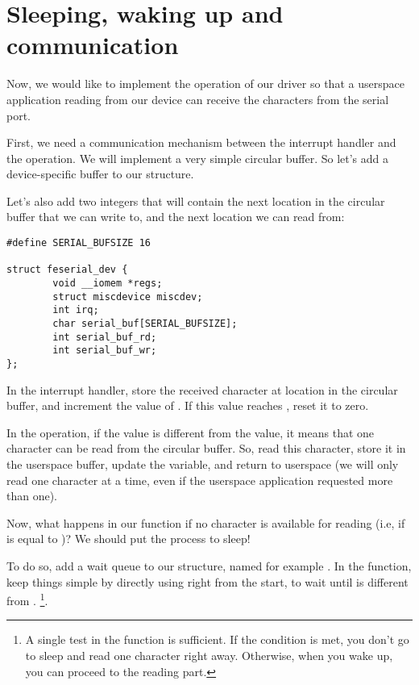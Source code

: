 \section{Sleeping, waking up and communication}

Now, we would like to implement the  operation of our
driver so that a userspace application reading from our device can
receive the characters from the serial port.

First, we need a communication mechanism between the interrupt handler
and the  operation. We will implement a very simple
circular buffer. So let's add a device-specific buffer to our 
 structure.

Let's also add two integers that will contain the next location
in the circular buffer that we can write to, and the next location
we can read from:

\begin{verbatim}
#define SERIAL_BUFSIZE 16

struct feserial_dev {
        void __iomem *regs;
        struct miscdevice miscdev;
        int irq;
        char serial_buf[SERIAL_BUFSIZE];
        int serial_buf_rd;
        int serial_buf_wr;
};
\end{verbatim}

In the interrupt handler, store the received character at location
 in the circular buffer, and increment the value
of . If this value reaches ,
reset it to zero.

In the  operation, if the  value is
different from the  value, it means that one
character can be read from the circular buffer. So, read this
character, store it in the userspace buffer, update the
 variable, and return to userspace (we will only
read one character at a time, even if the userspace application
requested more than one).

Now, what happens in our  function if no character is
available for reading (i.e, if  is equal to
)? We should put the process to sleep!

To do so, add a wait queue to our  structure,
named for example . In the  function,
keep things simple by directly using 
right from the start, to wait until 
is different from . \footnote{A single test in the 
 function is sufficient. If the
condition is met, you don't go to sleep and read one character right away.
Otherwise, when you wake up, you can proceed to the reading part.}.

